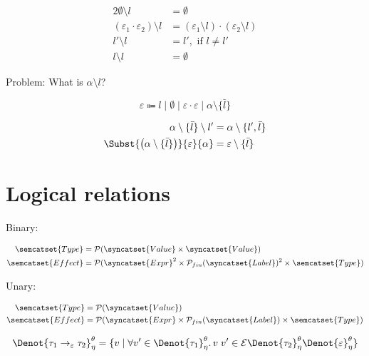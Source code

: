 \begin{alignat*}{2}
  \emptyset \setminus l &= \emptyset \\
  (\varepsilon_1 \cdot \varepsilon_2) \setminus l &=
    (\varepsilon_1 \setminus l) \cdot (\varepsilon_2 \setminus l)\\
  l' \setminus l &= l', \text{ if } l \not= l'\\
  l \setminus l  &= \emptyset
\end{alignat*}

Problem: What is $\alpha \setminus l$?

\[
  \varepsilon  \Coloneqq l \mid \emptyset \mid \varepsilon\cdot\varepsilon
    \mid \alpha \setminus \{ \bar{l} \}
\]

\begin{alignat*}{2}
  \alpha\setminus\{\bar{l}\}\setminus l' &= \alpha\setminus\{l', \bar{l}\}\\
  \Subst{\left(\alpha\setminus\{\bar{l}\}\right)}{\varepsilon}{\alpha} &=
    \varepsilon\setminus\{\bar{l}\}
\end{alignat*}


\section{Logical relations}

Binary:

\begin{alignat*}{2}
  \semcatset{Type} & = \mathcal{P}(\syncatset{Value} \times \syncatset{Value}) \\
  \semcatset{Effect} & = \mathcal{P}(\syncatset{Expr}^2 \times \mathcal{P}_{fin}(\syncatset{Label})^2 \times \semcatset{Type})
\end{alignat*}

Unary:

\begin{alignat*}{2}
  \semcatset{Type} & = \mathcal{P}(\syncatset{Value}) \\
  \semcatset{Effect} & = \mathcal{P}(\syncatset{Expr} \times \mathcal{P}_{fin}(\syncatset{Label}) \times \semcatset{Type})
\end{alignat*}

\newcommand\DenotEnv[1]{\Denot{#1}^\theta_\eta}

\begin{alignat*}{2}
  \DenotEnv{\tau_1 \to_\varepsilon \tau_2} & =
    \{v \mid \forall v' \in \DenotEnv{\tau_1}\ldotp v\;v' \in \mathcal{E}\DenotEnv{\tau_2}\DenotEnv{\varepsilon}\} \\
\end{alignat*}

